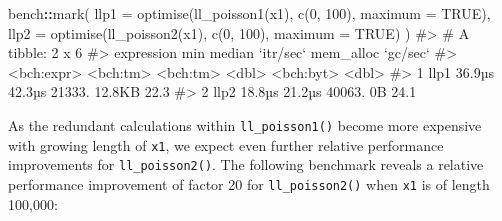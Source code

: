 \documentclass[
]{krantz}
\makeatletter
\newenvironment{Shaded}{\begin{snugshade}}{\end{snugshade}}
\newcommand{\CommentTok}[1]{\textcolor[rgb]{0.56,0.35,0.01}{\textit{#1}}}
\newcommand{\DataTypeTok}[1]{\textcolor[rgb]{0.13,0.29,0.53}{#1}}
\newcommand{\DecValTok}[1]{\textcolor[rgb]{0.00,0.00,0.81}{#1}}
\newcommand{\KeywordTok}[1]{\textcolor[rgb]{0.13,0.29,0.53}{\textbf{#1}}}
\newcommand{\NormalTok}[1]{#1}
\newcommand{\OperatorTok}[1]{\textcolor[rgb]{0.81,0.36,0.00}{\textbf{#1}}}
\newcommand{\OtherTok}[1]{\textcolor[rgb]{0.56,0.35,0.01}{#1}}
\newenvironment{kframe}{%
\medskip{}
\setlength{\fboxsep}{.8em}
 \def\at@end@of@kframe{}%
 \ifinner\ifhmode%
  \def\at@end@of@kframe{\end{minipage}}%
  \begin{minipage}{\columnwidth}%
 \fi\fi%
 \def\FrameCommand##1{\hskip\@totalleftmargin \hskip-\fboxsep
 \colorbox{shadecolor}{##1}\hskip-\fboxsep
     \hskip-\linewidth \hskip-\@totalleftmargin \hskip\columnwidth}%
 \MakeFramed {\advance\hsize-\width
   \@totalleftmargin\z@ \linewidth\hsize
   \@setminipage}}%
 {\par\unskip\endMakeFramed%
 \at@end@of@kframe}
\renewenvironment{Shaded}{\begin{kframe}}{\end{kframe}}
\renewcommand{\KeywordTok} [1]{\textcolor[rgb]{0.00,0.44,0.13}{{#1}}}
\renewcommand{\DataTypeTok}[1]{\textcolor[rgb]{0.56,0.13,0.00}{{#1}}}
\renewcommand{\DecValTok}  [1]{\textcolor[rgb]{0.25,0.63,0.44}{{#1}}}
\renewcommand{\CommentTok} [1]{\textcolor[rgb]{0.38,0.63,0.69}{{#1}}}
\renewcommand{\OtherTok}   [1]{\textcolor[rgb]{0.00,0.44,0.13}{{#1}}}
\renewcommand{\NormalTok}  [1]{{#1}}
\makeatother
\begin{document}
\begin{Shaded}
\begin{Highlighting}[]
\NormalTok{bench}\OperatorTok{::}\KeywordTok{mark}\NormalTok{(}
  \DataTypeTok{llp1 =} \KeywordTok{optimise}\NormalTok{(}\KeywordTok{ll_poisson1}\NormalTok{(x1), }\KeywordTok{c}\NormalTok{(}\DecValTok{0}\NormalTok{, }\DecValTok{100}\NormalTok{), }\DataTypeTok{maximum =} \OtherTok{TRUE}\NormalTok{),}
  \DataTypeTok{llp2 =} \KeywordTok{optimise}\NormalTok{(}\KeywordTok{ll_poisson2}\NormalTok{(x1), }\KeywordTok{c}\NormalTok{(}\DecValTok{0}\NormalTok{, }\DecValTok{100}\NormalTok{), }\DataTypeTok{maximum =} \OtherTok{TRUE}\NormalTok{)}
\NormalTok{)}
\CommentTok{#> # A tibble: 2 x 6}
\CommentTok{#>   expression      min   median `itr/sec` mem_alloc `gc/sec`}
\CommentTok{#>   <bch:expr> <bch:tm> <bch:tm>     <dbl> <bch:byt>    <dbl>}
\CommentTok{#> 1 llp1         36.9µs   42.3µs    21333.    12.8KB     22.3}
\CommentTok{#> 2 llp2         18.8µs   21.2µs    40063.        0B     24.1}
\end{Highlighting}
\end{Shaded}

As the redundant calculations within \texttt{ll\_poisson1()} become more expensive with growing length of \texttt{x1}, we expect even further relative performance improvements for \texttt{ll\_poisson2()}. The following benchmark reveals a relative performance improvement of factor 20 for \texttt{ll\_poisson2()} when \texttt{x1} is of length 100,000:
\end{document}
